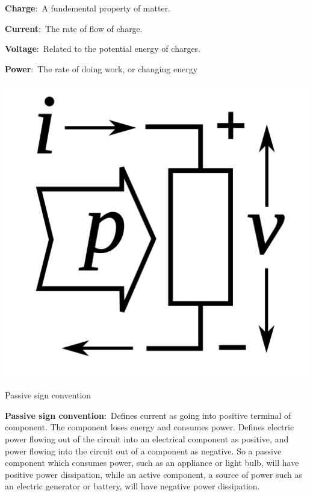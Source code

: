 \documentclass[nobib]{tufte-handout}
\newcommand{\defn}[2]{\noindent\textbf{#1}:\ #2}
\begin{document}
\defn{Charge}{A fundemental property of matter.}

\defn{Current}{The rate of flow of charge.}

\defn{Voltage}{Related to the potential energy of charges.}

\defn{Power}{The rate of doing work, or changing energy}

\begin{marginfigure}
    \centering
    \includegraphics{images/Passive_sign_convention.svg.png}
    \caption{Passive sign convention}
    \label{fig:psc} 
\end{marginfigure}

\defn{Passive sign convention}{Defines current as going into 
positive terminal of component. The component loses energy 
and consumes power.
Defines electric power flowing out of the circuit into an electrical 
component as positive, and power flowing into the circuit out 
of a component as negative. So a passive component which 
consumes power, such as an appliance or light bulb, will 
have positive power dissipation, while an active component, 
a source of power such as an electric generator or battery, 
will have negative power dissipation.}
\end{document}
